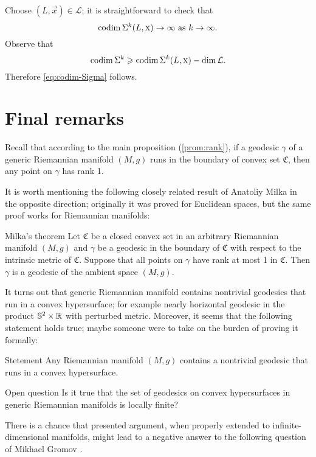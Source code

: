 \documentclass[a4paper,10pt]{article}
\begin{document}
Choose $(L,\vec x)\in\mathcal{L}$;
it is straightforward to check that 
\[\codim\Sigma^k(L,\vec x)\to\infty$ as $k\to \infty.\]
Observe that 
\[\operatorname{\rm codim}\Sigma^k\geqslant \operatorname{\rm codim}\Sigma^k(L,\text{\sc{x}})-\operatorname{\rm dim}\mathcal{L}.\]
Therefore \ref{eq:codim-Sigma} follows.
\qeds

\section{Final remarks}

Recall that according to the main proposition (\ref{prom:rank}), if a geodesic $\gamma$ of a generic Riemannian manifold $(M,g)$ runs in the boundary of convex set $\mathfrak{C}$, then any point on $\gamma$ has rank 1.

It is worth mentioning the following closely  related result of Anatoliy Milka \cite[§~4]{milka} in the opposite direction; originally it was proved for Euclidean spaces, but the same proof works for Riemannian manifolds:

\begin{thm}{Milka's theorem}
Let $\mathfrak{C}$ be a closed convex set in an arbitrary Riemannian manifold $(M,g)$ and $\gamma$ be a geodesic in the boundary of $\mathfrak{C}$ with respect to the intrinsic metric of $\mathfrak {C}$.
Suppose that all points on $\gamma$ have rank at most 1 in $\mathfrak{C}$.
Then $\gamma$ is a geodesic of the ambient space $(M,g)$.
\end{thm}

It turns out that generic Riemannian manifold contains nontrivial geodesics that run in a convex hypersurface;
for example nearly horizontal geodesic in the product $\mathbb{S}^2\times \mathbb{R}$ with perturbed metric. 
Moreover, it seems that the following statement holds true; maybe someone were to take on the burden of proving it formally:

\begin{thm}{Stetement}
Any Riemannian manifold $(M,g)$ contains a nontrivial geodesic  that runs in a convex hypersurface.
\end{thm}


\begin{thm}{Open question}
Is it true that the set of geodesics on convex hypersurfaces in generic Riemannian manifolds is locally finite?
\end{thm}

There is a chance that presented argument, when properly extended to infinite-dimensional manifolds, might lead to a negative answer to the following question of Mikhael Gromov \cite[6.B\textsubscript{1}(f)]{gromov-1993}.
\end{document}
